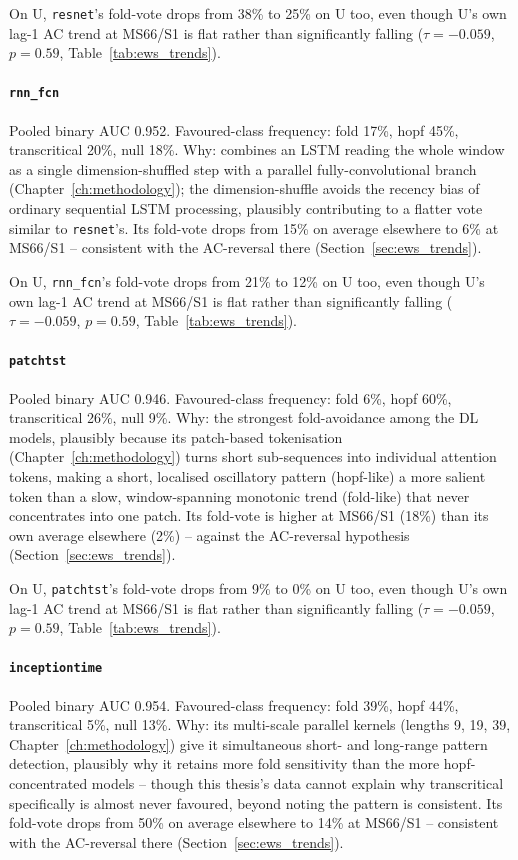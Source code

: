 On U, \texttt{resnet}'s fold-vote drops from 38\% to 25\% on U too, even though U's own lag-1 AC trend at MS66/S1 is flat rather than significantly falling ($\tau=-0.059$, $p=0.59$, Table~\ref{tab:ews_trends}).

\paragraph{\texttt{rnn\_fcn}} Pooled binary AUC 0.952. Favoured-class frequency: fold 17\%, hopf 45\%, transcritical 20\%, null 18\%. Why: combines an LSTM reading the whole window as a single dimension-shuffled step with a parallel fully-convolutional branch (Chapter~\ref{ch:methodology}); the dimension-shuffle avoids the recency bias of ordinary sequential LSTM processing, plausibly contributing to a flatter vote similar to \texttt{resnet}'s. Its fold-vote drops from 15\% on average elsewhere to 6\% at MS66/S1 -- consistent with the AC-reversal there (Section~\ref{sec:ews_trends}).

On U, \texttt{rnn\_fcn}'s fold-vote drops from 21\% to 12\% on U too, even though U's own lag-1 AC trend at MS66/S1 is flat rather than significantly falling ($\tau=-0.059$, $p=0.59$, Table~\ref{tab:ews_trends}).

\paragraph{\texttt{patchtst}} Pooled binary AUC 0.946. Favoured-class frequency: fold 6\%, hopf 60\%, transcritical 26\%, null 9\%. Why: the strongest fold-avoidance among the DL models, plausibly because its patch-based tokenisation (Chapter~\ref{ch:methodology}) turns short sub-sequences into individual attention tokens, making a short, localised oscillatory pattern (hopf-like) a more salient token than a slow, window-spanning monotonic trend (fold-like) that never concentrates into one patch. Its fold-vote is higher at MS66/S1 (18\%) than its own average elsewhere (2\%) -- against the AC-reversal hypothesis (Section~\ref{sec:ews_trends}).

On U, \texttt{patchtst}'s fold-vote drops from 9\% to 0\% on U too, even though U's own lag-1 AC trend at MS66/S1 is flat rather than significantly falling ($\tau=-0.059$, $p=0.59$, Table~\ref{tab:ews_trends}).

\paragraph{\texttt{inceptiontime}} Pooled binary AUC 0.954. Favoured-class frequency: fold 39\%, hopf 44\%, transcritical 5\%, null 13\%. Why: its multi-scale parallel kernels (lengths 9, 19, 39, Chapter~\ref{ch:methodology}) give it simultaneous short- and long-range pattern detection, plausibly why it retains more fold sensitivity than the more hopf-concentrated models -- though this thesis's data cannot explain why transcritical specifically is almost never favoured, beyond noting the pattern is consistent. Its fold-vote drops from 50\% on average elsewhere to 14\% at MS66/S1 -- consistent with the AC-reversal there (Section~\ref{sec:ews_trends}).

